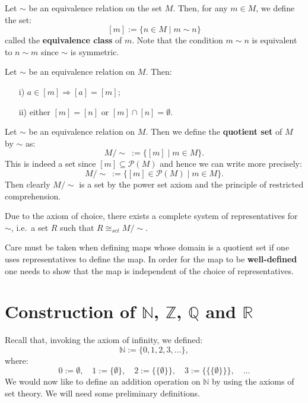 \documentclass[root.tex]{subfiles}
\begin{document}
\begin{mydef}
Let $\sim$ be an equivalence relation on the set $M$. Then, for any $m \in M$, we define the set:
$$
[m] := \{n \in M \mid m \sim n\}
$$
called the \textbf{equivalence class} of $m$. Note that the condition $m \sim n$ is equivalent to $n \sim m$ since $\sim$ is symmetric.
\end{mydef}

\begin{proposition}
Let $\sim$ be an equivalence relation on $M$. Then:
\begin{enumerate}
\item[i)] $a \in [m] \Rightarrow [a]=[m]$;
\item[ii)] either $[m]=[n]$ or $[m] \cap [n] = \emptyset$.
\end{enumerate}
\end{proposition}

\begin{mydef}
Let $\sim$ be an equivalence relation on $M$. Then we define the \textbf{quotient set} of $M$ by $\sim$ as:
$$
M/\!\sim\ := \{[m]\mid m \in M\}.
$$
This is indeed a set since $[m]\subseteq\mathcal{P}(M)$ and hence we can write more precisely:
$$
M/\!\sim\ := \{[m]\in\mathcal{P}(M)\mid m \in M\}.
$$
Then clearly $M/\!\sim$ is a set by the power set axiom and the principle of restricted comprehension.
\end{mydef}

\begin{remark}
Due to the axiom of choice, there exists a complete system of representatives for $\sim$, i.e.\ a set $R$ such that $R \cong_{set} M/\!\sim$.
\end{remark}

\begin{remark}
Care must be taken when defining maps whose domain is a quotient set if one uses representatives to define the map. In order for the map to be \textbf{well-defined} one needs to show that the map is independent of the choice of representatives. 
\end{remark}


\section{\texorpdfstring{Construction of $\mathbb{N}$, $\mathbb{Z}$, $\mathbb{Q}$ and $\mathbb{R}$}{Construction of N, Z, Q and R}}%

 Recall that, invoking the axiom of infinity, we defined:
 $$
 \mathbb{N} := \{0,1,2,3,\ldots\},
 $$
 where:
 $$
 0 :=\emptyset , \quad 1  := \{\emptyset\},\quad 2:= \{\{\emptyset\}\}, \quad 3 := \{\{\{\emptyset\}\}\} , \quad \ldots
 $$
 We would now like to define an addition operation on $\mathbb{N}$ by using the axioms of set theory. We will need some preliminary definitions.
\end{document}
